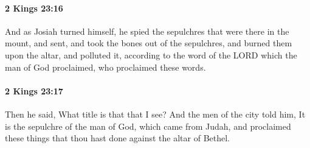 		\paragraph{2 Kings 23:16} %
			\label{2KINGS-23-16}

			And as Josiah turned himself, he spied the sepulchres that were there in the mount, and sent, and took the bones out of the sepulchres, and burned them upon the altar, and polluted it, according to the word of the LORD which the man of God proclaimed, who proclaimed these words.


		\paragraph{2 Kings 23:17} %
			\label{2KINGS-23-17}

			Then he said, What title is that that I see? And the men of the city told him, It is the sepulchre of the man of God, which came from Judah, and proclaimed these things that thou hast done against the altar of Bethel.

